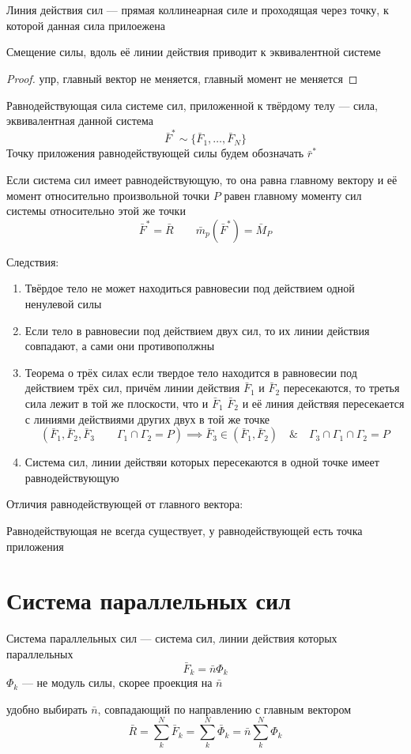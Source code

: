 \documentclass[crop=false]{standalone}
\begin{document}
\section{}
\Def Линия действия сил — прямая коллинеарная силе и проходящая через точку, к которой данная сила прилоежена

\noindent \keypoint Смещение силы, вдоль её линии действия приводит к эквивалентной системе
\begin{proof}
    упр, главный вектор не меняется, главный момент не меняется
\end{proof}

\Def Равнодействующая сила системе сил, приложенной к твёрдому телу — сила, эквивалентная данной система
\[\bar F^* \sim \{\bar F_1 , \dots , \bar F_N\}\]
Точку приложения равнодействующей силы будем обозначать $\bar r^*$

\begin{theorem}[Вариньона]
Если система сил имеет равнодействующую, то она равна главному вектору и её момент относительно произвольной точки $P$ равен главному моменту сил системы относительно этой же точки
\[\bar F^* = \bar R \qquad \bar m_p(\bar F^*) = \bar M_P \]
\end{theorem}
Следствия:
\begin{enumerate}
    \item 
    Твёрдое тело не может находиться равновесии под действием одной ненулевой силы
    
    \item 
    Если тело в равновесии под действием двух сил, то их линии действия совпадают, а сами они противополжны
    
    \item Теорема о трёх силах
    если твердое тело находится в равновесии под действием трёх сил, причём линии действия $\bar F_1$ и $\bar F_2$ пересекаются, то третья сила лежит в той же плоскости, что и $\bar F_1$ $\bar F_2$ и её линия действяя пересекается с линиями действиями других двух в той же точке
    \[(\bar F_1, \bar F_2, \bar F_3 \qquad \Gamma_1 \cap \Gamma_2 = P) \implies \bar F_3 \in (\bar F_1 , \bar F_2) \quad \& \quad \Gamma_3 \cap \Gamma_1 \cap \Gamma_2 = P\]
    
    \item Система сил, линии действяи которых пересекаются в одной точке имеет равнодействующую
\end{enumerate}

\noindent \keypoint Отличия равнодействующей от главного вектора:

Равнодействующая не всегда существует, у равнодействующей есть точка приложения

\section{Система параллельных сил}

\Def Система параллельных сил — система сил, линии действия которых параллельных
\[\bar F_k = \bar n \Phi_k\]
$\Phi_k$ — не модуль силы, скорее проекция на $\bar n$

удобно выбирать $\bar n$, совпадающий по направлению с главным вектором
\[\bar R = \sum_k^N \bar F_k = \sum_k^N \bar \Phi_k = \bar n \sum_k^N \Phi_k \]
\end{document}
